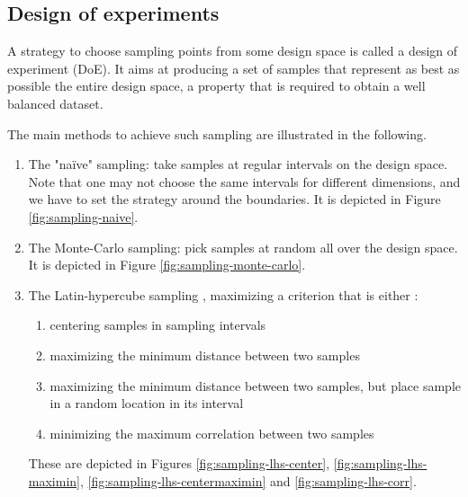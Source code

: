 \subsection{Design of experiments}

A strategy to choose sampling points from some design space is called a design of experiment (DoE). It aims at producing a set of samples that represent as best as possible the entire design space, a property that is required to obtain a well balanced dataset. 

The main methods to achieve such sampling are \cite{doe} illustrated in the following.
\begin{enumerate}
    \item The "naïve" sampling: take samples at regular intervals on the design space. Note that one may not choose the same intervals for different dimensions, and we have to set the strategy around the boundaries. It is depicted in Figure \ref{fig:sampling-naive}.
    \item The Monte-Carlo sampling: pick samples at random all over the design space. It is depicted in Figure \ref{fig:sampling-monte-carlo}.
    \item The Latin-hypercube sampling \cite{wiki-lhs}, maximizing a criterion that is either \cite{pydoe-docs}:
    \begin{enumerate}
        \item centering samples in sampling intervals
        \item maximizing the minimum distance between two samples
        \item maximizing the minimum distance between two samples, but place sample in a random location in its interval
        \item minimizing the maximum correlation between two samples
    \end{enumerate}
    These are depicted in Figures \ref{fig:sampling-lhs-center}, \ref{fig:sampling-lhs-maximin}, \ref{fig:sampling-lhs-centermaximin} and \ref{fig:sampling-lhs-corr}.
\end{enumerate}

